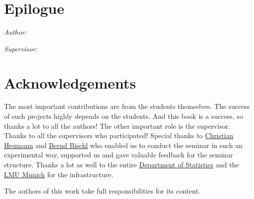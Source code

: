 \documentclass[
]{krantz}
\begin{document}
\hypertarget{epilogue}{%
\chapter{Epilogue}\label{epilogue}}

\emph{Author:}

\emph{Supervisor:}

\hypertarget{acknowledgements}{%
\chapter{Acknowledgements}\label{acknowledgements}}

The most important contributions are from the students themselves.
The success of such projects highly depends on the students.
And this book is a success, so thanks a lot to all the authors!
The other important role is the supervisor.
Thanks to all the supervisors who participated!
Special thanks to \href{https://www.misoda.statistik.uni-muenchen.de/personen/professoren/heumann/index.html}{Christian Heumann} and \href{https://www.statistik.uni-muenchen.de/personen/professoren/bischl/index.html}{Bernd Bischl} who enabled us to conduct the seminar in such an experimental way, supported us and gave valuable feedback for the seminar structure.
Thanks a lot as well to the entire \href{https://www.statistik.uni-muenchen.de/}{Department of Statistics} and the \href{http://www.en.uni-muenchen.de/index.html}{LMU Munich} for the infrastructure.

The authors of this work take full responsibilities for its content.

  

\backmatter
\printindex
\end{document}
